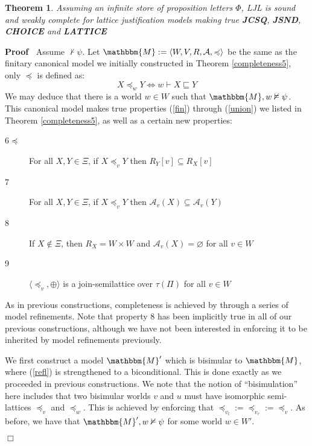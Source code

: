 \documentclass{article}
\newcommand{\assign}{:=}
\newcommand{\nin}{\not\in}
\newcommand{\tmtextbf}[1]{{\bfseries{#1}}}
\newenvironment{descriptioncompact}{\begin{description} }{\end{description}}
\newenvironment{proof}{\noindent\textbf{Proof\ }}{\hspace*{\fill}$\Box$\medskip}
\newtheorem{theorem}{Theorem}
\begin{document}
\begin{theorem}
  \label{completeness6}Assuming an infinite store of proposition letters
  $\Phi$, LJL is sound and weakly complete for lattice justification models
  making true \tmtextbf{JCSQ}, \tmtextbf{JSND}, \tmtextbf{CHOICE} and
  \tmtextbf{LATTICE}
\end{theorem}

\begin{proof}
  Assume $\nvdash \psi$.  Let $\mathbbm{M} \assign \langle W, V, R,
  \mathcal{A}, \preccurlyeq \rangle$ be the same as the finitary canonical
  model we initially constructed in Theorem \ref{completeness5}, only
  $\preccurlyeq$ is defined as:
  \[ X \preccurlyeq_w Y \Longleftrightarrow w \vdash X \sqsubseteq Y \]
  We may deduce that there is a world $w \in W$ such that $\mathbbm{M}, w
  \nvDash \psi$.  This canonical model makes true properties (\ref{fin})
  through (\ref{union}) we listed in Theorem \ref{completeness5}, as well as a
  certain new properties:
  
  \begin{descriptioncompact}
    \item[6$\preccurlyeq$] For all $X, Y \in \Xi$, if $X \preccurlyeq_v Y$
    then $R_Y [v] \subseteq R_X [v]$
    
    \item[7] For all $X, Y \in \Xi$, if $X \preccurlyeq_v Y$ then
    $\mathcal{A}_v (X) \subseteq \mathcal{A}_v (Y)$
    
    \item[8] If $X \nin \Xi$, then $R_X = W \times W$ and $\mathcal{A}_v (X) =
    \varnothing$ for all $v \in W$
    
    \item[9] $\langle \preccurlyeq_v, \oplus \rangle$ is a join-semilattice
    over $\tau (\Pi)$ for all $v \in W$
  \end{descriptioncompact}
  
  As in previous constructions, completeness is achieved by through a series
  of model refinements.  Note that property 8 has been implicitly true in all
  of our previous constructions, although we have not been interested in
  enforcing it to be inherited by model refinements previously.
  
  
  
  We first construct a model $\mathbbm{M}'$ which is bisimular to
  $\mathbbm{M}$, where (\ref{refl}) is strengthened to a biconditional.  This
  is done exactly as we proceeded in previous constructions. We note that the
  notion of ``bisimulation'' here includes that two bisimular worlds $v$ and
  $u$ must have isomorphic semi-lattices $\preccurlyeq_v$ and
  $\preccurlyeq_w$.  This is achieved by enforcing that $\preccurlyeq_{v_l}
  \assign \preccurlyeq_{v_r} \assign \preccurlyeq_v$. As before, we have that
  $\mathbbm{M}', w \nvDash \psi$ for some world $w \in W'$.
  

\end{proof}
\end{document}
